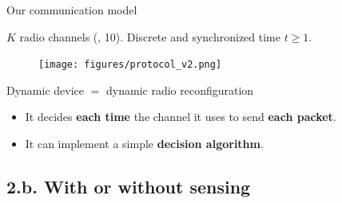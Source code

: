 \documentclass[12pt,english,ignorenonframetext,]{beamer}
\providecommand{\tightlist}{%
  \setlength{\itemsep}{0pt}\setlength{\parskip}{0pt}}
\begin{document}
\begin{frame}{Our communication model}

\(K\) radio channels (\eg, 10).
Discrete and synchronized time \(t\geq1\).

\begin{figure}[h!]
\centering
\texttt{[image: figures/protocol\_v2.png]}
\end{figure}

\begin{block}{Dynamic device \(=\) dynamic radio reconfiguration}

\begin{itemize}\tightlist
\item
  It decides \textbf{each time} the channel it uses to send \textbf{each
  packet}.
\item
  It can implement a simple \textbf{decision algorithm}.
\end{itemize}

\end{block}

\end{frame}



\subsection{\hfill{}2.b. With or without sensing\hfill{}}
\end{document}
